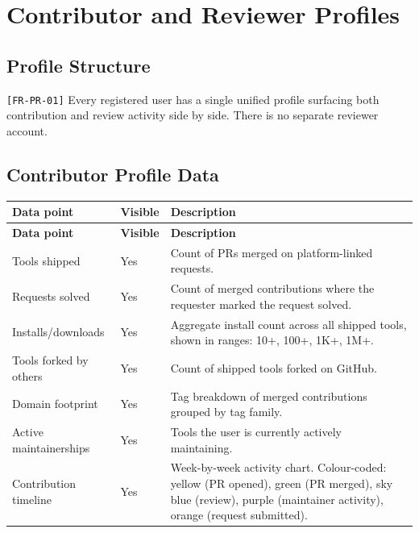 \documentclass[12pt,a4paper]{article}
\begin{document}
\section{Contributor and Reviewer Profiles}

\subsection{Profile Structure}
\texttt{[FR-PR-01]} Every registered user has a single unified profile surfacing both contribution and review activity side by side. There is no separate reviewer account.

\subsection{Contributor Profile Data}
\begin{longtable}{L{4cm} L{1.8cm} L{7.5cm}}
  \color{white}\bfseries Data point & \color{white}\bfseries Visible & \color{white}\bfseries Description \\
  \endfirsthead
  \color{white}\bfseries Data point & \color{white}\bfseries Visible & \color{white}\bfseries Description \\
  \endhead\hline
  Tools shipped          & Yes & Count of PRs merged on platform-linked requests. \\
  Requests solved        & Yes & Count of merged contributions where the requester marked the request solved. \\
  Installs/downloads     & Yes & Aggregate install count across all shipped tools, shown in ranges: 10+, 100+, 1K+, 1M+. \\
  Tools forked by others & Yes & Count of shipped tools forked on GitHub. \\
  Domain footprint       & Yes & Tag breakdown of merged contributions grouped by tag family. \\
  Active maintainerships & Yes & Tools the user is currently actively maintaining. \\
  Contribution timeline  & Yes & Week-by-week activity chart. Colour-coded: yellow (PR opened), green (PR merged), sky blue (review), purple (maintainer activity), orange (request submitted). \\
  \hline
\end{longtable}
\end{document}
